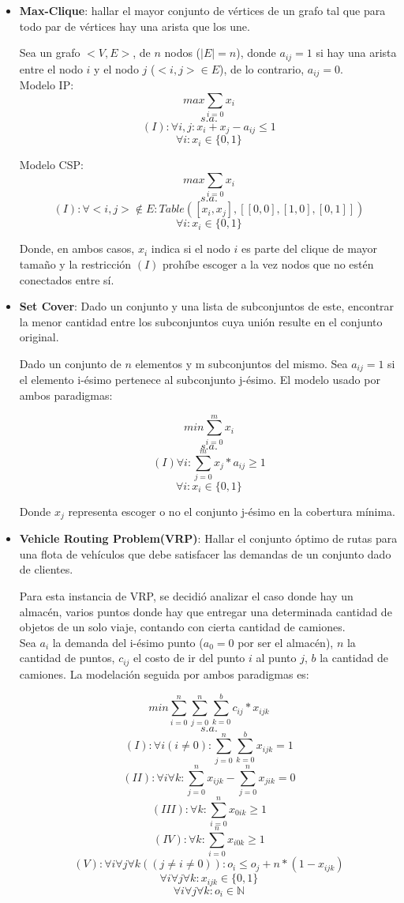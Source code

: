 \documentclass[12pt]{report}
\begin{document}
\begin{itemize}
\item \textbf{Max-Clique}: hallar el mayor conjunto de vértices de un grafo tal que para todo par de vértices hay una arista que los une.

Sea un grafo $<V,E>$, de $n$ nodos ($|E|=n$), donde $a_{ij}=1$ si hay una arista entre el nodo $i$ y el nodo $j$ ($<i,j>\in E$), de lo contrario, $a_{ij}=0$.\\

Modelo IP:
$$max \sum_{i=0} x_i$$
$$s.a.$$
$$(I):\forall i,j: x_i+x_j-a_{ij}\leq 1$$
$$\forall i: x_i\in\{0,1\}$$

Modelo CSP:
$$max \sum_{i=0} x_i$$
$$s.a.$$
$$(I):\forall <i,j> \not\in E:Table([x_i,x_j],[[0,0],[1,0],[0,1]])$$
$$\forall i: x_i\in\{0,1\}$$

Donde, en ambos casos, $x_i$ indica si el nodo $i$ es parte del clique de mayor tamaño y la restricción $(I)$ prohíbe escoger a la vez nodos que no estén conectados entre sí.

\item \textbf{Set Cover}: Dado un conjunto y una lista de subconjuntos de este, encontrar la menor cantidad entre los subconjuntos cuya unión resulte en el conjunto original.

Dado un conjunto de $n$ elementos y m subconjuntos del mismo. Sea $a_{ij}=1$ si el elemento i-ésimo pertenece al subconjunto j-ésimo. El modelo usado por ambos paradigmas:

$$min \sum_{i=0}^m x_i$$
$$s.a.$$
$$(I) \forall i:\sum_{j=0}^mx_{j}*a_{ij}\geq1$$
$$\forall i: x_i\in\{0,1\}$$

Donde $x_j$ representa escoger o no el conjunto j-ésimo en la cobertura mínima.

\item \textbf{Vehicle Routing Problem(VRP)}:  Hallar el conjunto óptimo de rutas para una flota de vehículos que debe satisfacer las demandas de un conjunto dado de clientes.

Para esta instancia de VRP, se decidió analizar el caso donde hay un almacén, varios puntos donde hay que entregar una determinada cantidad de objetos de un solo viaje, contando con cierta cantidad de camiones.\\

Sea $a_i$ la demanda del i-ésimo punto ($a_0=0$ por ser el almacén), $n$ la cantidad de puntos, $c_{ij}$ el costo de ir del punto $i$ al punto $j$, $b$ la cantidad de camiones. La modelación seguida por ambos paradigmas es:

$$min \sum_{i=0}^n\sum_{j=0}^n\sum_{k=0}^bc_{ij}*x_{ijk}$$
$$s.a.$$
$$(I):\forall i(i\neq0):\sum_{j=0}^n\sum_{k=0}^bx_{ijk}=1$$
$$(II):\forall i\forall k :\sum_{j=0}^nx_{ijk}-\sum_{j=0}^nx_{jik}=0$$
$$(III):\forall k:\sum_{i=0}^nx_{0ik}\geq1$$
$$(IV):\forall k:\sum_{i=0}^nx_{i0k}\geq1$$
$$(V):\forall i\forall j\forall k ((j\neq i\neq0)):o_i\leq o_j+n*(1-x_{ijk})$$
$$\forall i\forall j\forall k:x_{ijk}\in\{0,1\}$$
$$\forall i\forall j\forall k:o_{i}\in\mathbb{N}$$


\end{itemize}
\end{document}
